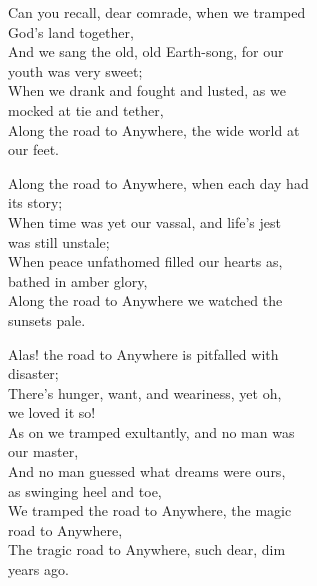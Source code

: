 
\begin{poemblock}    
Can you recall, dear comrade, when we tramped\\
\idt God's land together,\\
And we sang the old, old Earth-song, for our\\
\idt youth was very sweet;\\
When we drank and fought and lusted, as we\\
\idt mocked at tie and tether,\\
Along the road to Anywhere, the wide world at\\
\idt our feet.

Along the road to Anywhere, when each day had\\
\idt its story;\\
When time was yet our vassal, and life's jest\\
\idt was still unstale;\\
When peace unfathomed filled our hearts as,\\
\idt bathed in amber glory,\\
Along the road to Anywhere we watched the\\
\idt sunsets pale.

Alas! the road to Anywhere is pitfalled with\\
\idt disaster;\\
There's hunger, want, and weariness, yet oh,\\
\idt we loved it so!\\
As on we tramped exultantly, and no man was\\
\idt our master,\\
And no man guessed what dreams were ours,\\
\idt as swinging heel and toe,\\
We tramped the road to Anywhere, the magic\\
\idt road to Anywhere,\\
The tragic road to Anywhere, such dear, dim\\
\idt years ago.
\end{poemblock}
